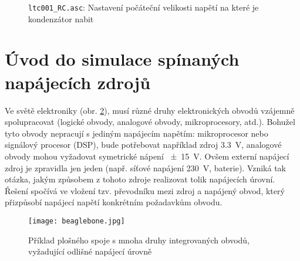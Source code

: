     \begin{figure}[ht!]
      \centering
      \caption{\texttt{ltc001\_RC.asc}: Nastavení počáteční velikosti napětí na které je 
               kondenzátor nabit}
      \label{SPICE:fig_ltc001}
    \end{figure}

  \section{Úvod do simulace spínaných napájecích zdrojů}
    
    Ve světě elektroniky (obr. \ref{SPICE:Basso_intro}), musí různé druhy elektronických obvodů 
    vzájemně spolupracovat (logické obvody, analogové obvody, mikroprocesory, atd.). Bohužel tyto 
    obvody nepracují s jediným napájecím napětím: mikroprocesor nebo signálový procesor (DSP), bude 
    potřebovat například zdroj \SI{3.3}{\volt}, analogové obvody mohou vyžadovat symetrické nápení 
    \SI{\pm15}{\volt}. Ovšem externí napájecí zdroj je zpravidla jen jeden (např. síťové napájení 
    \SI{230}{\volt}, baterie). Vzniká tak otázka, jakým způsobem z tohoto zdroje realizovat tolik 
    napájecích úrovní. Řešení spočívá ve vložení tzv. převodníku mezi zdroj a napájený obvod, který 
    přizpůsobí napájecí napětí konkrétním požadavkům obvodu.
    
    \begin{figure}[ht!]
      \centering
      \texttt{[image: beaglebone.jpg]}
      \caption{Příklad plošného spoje s mnoha druhy integrovaných obvodů, vyžadující odlišné 
               napájecí úrovně}
      \label{SPICE:Basso_intro}
    \end{figure}

